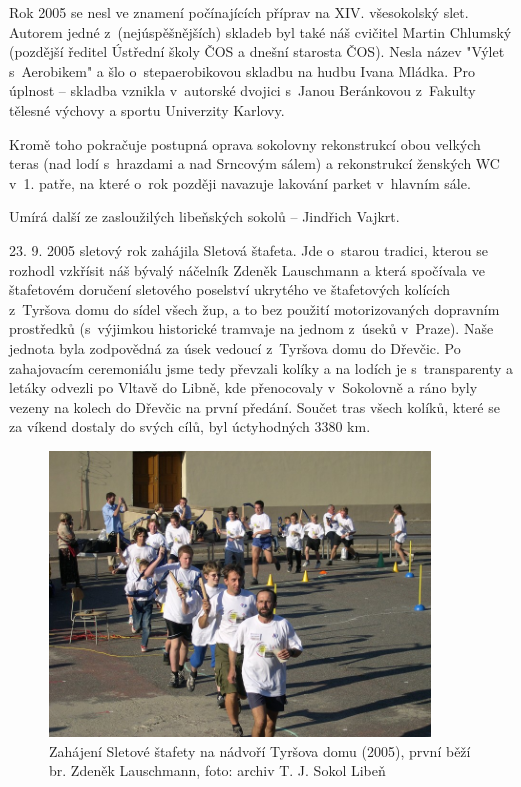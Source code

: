 \documentclass[a5paper, 11pt, twoside]{article}
\begin{document}
Rok 2005 se nesl ve znamení počínajících příprav na XIV. všesokolský
slet. Autorem jedné z~(nejúspěšnějších) skladeb byl také náš cvičitel
Martin Chlumský (pozdější ředitel Ústřední školy ČOS a dnešní starosta
ČOS). Nesla název "Výlet s~Aerobikem" a šlo o~stepaerobikovou skladbu
na hudbu Ivana Mládka. Pro úplnost -- skladba vznikla v~autorské dvojici
s~Janou Beránkovou z~Fakulty tělesné výchovy a sportu Univerzity
Karlovy.

Kromě toho pokračuje postupná oprava sokolovny rekonstrukcí obou velkých
teras (nad lodí s~hrazdami a nad Srncovým sálem) a rekonstrukcí ženských
WC v~1. patře, na které o~rok později navazuje lakování parket v~hlavním
sále.

Umírá další ze zasloužilých libeňských sokolů -- Jindřich Vajkrt.

23. 9. 2005 sletový rok zahájila Sletová štafeta. Jde o~starou tradici,
kterou se rozhodl vzkřísit náš bývalý náčelník Zdeněk Lauschmann a která
spočívala ve štafetovém doručení sletového poselství ukrytého ve
štafetových kolících z~Tyršova domu do sídel všech žup, a to bez použití
motorizovaných dopravním prostředků (s~výjimkou historické tramvaje na
jednom z~úseků v~Praze). Naše jednota byla zodpovědná za úsek vedoucí
z~Tyršova domu do Dřevčic. Po zahajovacím ceremoniálu jsme tedy převzali
kolíky a na lodích je s~transparenty a letáky odvezli po Vltavě do
Libně, kde přenocovaly v~Sokolovně a ráno byly vezeny na kolech do
Dřevčic na první předání. Součet tras všech kolíků, které se za víkend
dostaly do svých cílů, byl úctyhodných 3380 km.

\begin{figure}[h!]
  \centering 
  \includegraphics[width=0.9\textwidth]{img/51_stafeta.jpg}
  \caption*{Zahájení Sletové štafety na nádvoří Tyršova domu (2005), první
  běží br. Zdeněk Lauschmann, foto: archiv T. J. Sokol Libeň}
\end{figure}
\end{document}
